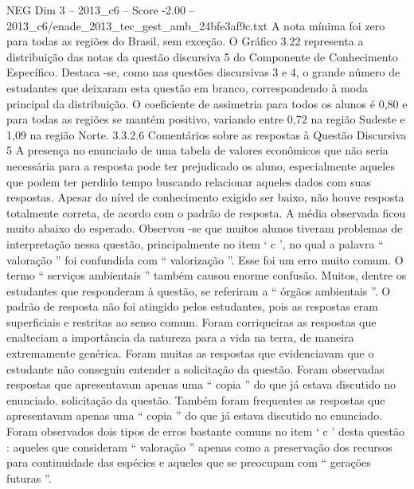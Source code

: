 \begin{textsample}{NEG Dim 3 – 2013\_c6 – Score -2.00 – 2013\_c6/enade\_2013\_tec\_gest\_amb\_24bfe3af9c.txt}
A nota mínima foi zero para todas as regiões do Brasil, sem exceção.
O Gráfico 3.22 representa a distribuição das notas da questão discursiva 5 do Componente de Conhecimento Específico.
Destaca -se, como nas questões discursivas 3 e 4, o grande número de estudantes que deixaram esta questão em branco, correspondendo à moda principal da distribuição.
O coeficiente de assimetria para todos os alunos é 0,80 e para todas as regiões se mantém positivo, variando entre 0,72 na região Sudeste e 1,09 na região Norte. 3.3.2.6 Comentários sobre as respostas à Questão Discursiva 5 A presença no enunciado de uma tabela de valores econômicos que não seria necessária para a resposta pode ter prejudicado os aluno, especialmente aqueles que podem ter perdido tempo buscando relacionar aqueles dados com suas respostas.
Apesar do nível de conhecimento exigido ser baixo, não houve resposta totalmente correta, de acordo com o padrão de resposta.
A média observada ficou muito abaixo do esperado.
Observou -se que muitos alunos tiveram problemas de interpretação nessa questão, principalmente no item ‘ c ’, no qual a palavra “ valoração ” foi confundida com “ valorização ”.
Esse foi um erro muito comum.
O termo “ serviços ambientais ” também causou enorme confusão.
Muitos, dentre os estudantes que responderam à questão, se referiram a “ órgãos ambientais ”.
O padrão de resposta não foi atingido pelos estudantes, pois as respostas eram superficiais e restritas ao senso comum.
Foram corriqueiras as respostas que enalteciam a importância da natureza para a vida na terra, de maneira extremamente genérica.
Foram muitas as respostas que evidenciavam que o estudante não conseguiu entender a solicitação da questão.
Foram observadas respostas que apresentavam apenas uma “ copia ” do que já estava discutido no enunciado. solicitação da questão.
Também foram frequentes as respostas que apresentavam apenas uma “ copia ” do que já estava discutido no enunciado.
Foram observados dois tipos de erros bastante comuns no item ‘ c ’ desta questão : aqueles que consideram “ valoração ” apenas como a preservação dos recursos para continuidade das espécies e aqueles que se preocupam com “ gerações futuras ”.

\end{textsample}
